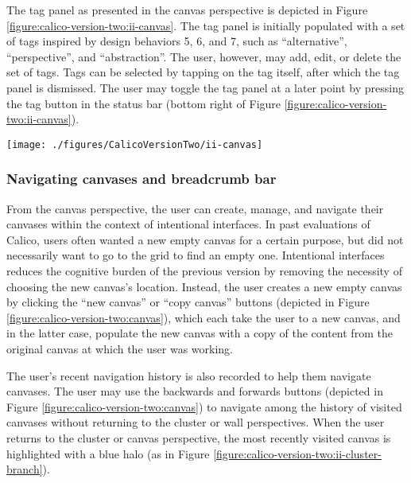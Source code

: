 \documentclass[12pt,fleqn]{ucithesis}
\begin{document}
The tag panel as presented in the canvas perspective is depicted in Figure \ref{figure:calico-version-two:ii-canvas}. The tag panel is initially populated with a set of tags inspired by design behaviors 5, 6, and 7, such as ``alternative'', ``perspective'', and ``abstraction''. The user, however, may add, edit, or delete the set of tags. Tags can be selected by tapping on the tag itself, after which the tag panel is dismissed. The user may toggle the tag panel at a later point by pressing the tag button in the status bar (bottom right of Figure \ref{figure:calico-version-two:ii-canvas}).

\begin{figure*}[tbh]
  \centering
  \texttt{[image: ./figures/CalicoVersionTwo/ii-canvas]}
  \caption{The tag panel appears in the upper-right upon entering a newly created canvas.}
  \label{figure:calico-version-two:ii-canvas}
\end{figure*}

\subsubsection{Navigating canvases and breadcrumb bar} 

From the canvas perspective, the user can create, manage, and navigate their canvases within the context of intentional interfaces. In past evaluations of Calico, users often wanted a new empty canvas for a certain purpose, but did not necessarily want to go to the grid to find an empty one. Intentional interfaces reduces the cognitive burden of the previous version by removing the necessity of choosing the new canvas's location. Instead, the user creates a new empty canvas by clicking the ``new canvas'' or ``copy canvas'' buttons (depicted in Figure \ref{figure:calico-version-two:canvas}), which each take the user to a new canvas, and in the latter case, populate the new canvas with a copy of the content from the original canvas at which the user was working.

The user's recent navigation history is also recorded to help them navigate canvases. The user may use the backwards and forwards buttons (depicted in Figure \ref{figure:calico-version-two:canvas}) to navigate among the history of visited canvases without returning to the cluster or wall perspectives. When the user returns to the cluster or canvas perspective, the most recently visited canvas is highlighted with a blue halo (as in Figure \ref{figure:calico-version-two:ii-cluster-branch}).
\end{document}
